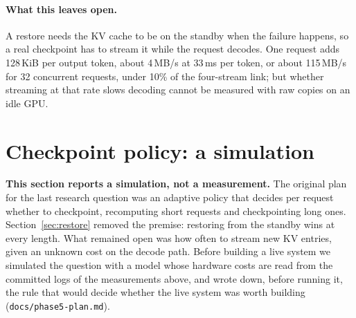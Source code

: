 \documentclass[10pt,twocolumn]{article}
\begin{document}
\paragraph{What this leaves open.} A restore needs the KV cache to be on the
standby when the failure happens, so a real checkpoint has to stream it while
the request decodes. One request adds 128\,KiB per output token, about
4\,MB/s at 33\,ms per token, or about 115\,MB/s for 32 concurrent requests,
under 10\% of the four-stream link; but whether streaming at that rate slows
decoding cannot be measured with raw copies on an idle GPU.

\section{Checkpoint policy: a simulation}
\label{sec:sim}

\textbf{This section reports a simulation, not a measurement.} The original
plan for the last research question was an adaptive policy that decides per
request whether to checkpoint, recomputing short requests and checkpointing
long ones. Section~\ref{sec:restore} removed the premise: restoring from the
standby wins at every length. What remained open was how often to stream new
KV entries, given an unknown cost on the decode path. Before building a live
system we simulated the question with a model whose hardware costs are read
from the committed logs of the measurements above, and wrote down, before
running it, the rule that would decide whether the live system was worth
building (\texttt{docs/phase5-plan.md}).
\end{document}
